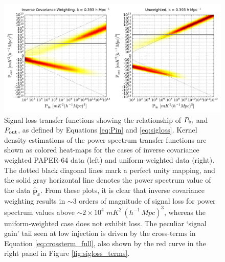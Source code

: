\documentclass[preprint2,numberedappendix,tighten]{aastex6}  %
\newcommand{\cc}[1]{{\color{purple} \textbf{[CC: #1]}}}
\begin{document}
\begin{figure}
	\centering
	\includegraphics[width=1\textwidth]{plots/sigloss_transfercurve_posneg.png}
	\caption{Signal loss transfer functions showing the relationship of $P_{\rm in}$ and $P_{\rm out}$, as defined by Equations \eqref{eq:Pin} and \eqref{eq:sigloss}. Kernel density estimations of the power spectrum transfer functions are shown as colored 
heat-maps for the cases of inverse covariance weighted PAPER-64 data (left) and uniform-weighted data (right). The dotted black 
diagonal lines mark a perfect unity mapping, and the solid gray horizontal line denotes the power spectrum value of the data $\widehat{\textbf{p}}_{x}$. From these plots, it is clear that inverse covariance weighting results in $\sim3$ orders of magnitude of signal loss 
for power spectrum values above $\sim$$2 \times 10^{4}$ $mK^{2} \, (h^{-1} \, Mpc)^{3}$, whereas the uniform-weighted case does 
not exhibit loss. The peculiar `signal gain' tail seen at low injection is driven by the cross-terms in Equation \eqref{eq:crossterm_full}, also shown by the red curve in the right panel in Figure \ref{fig:sigloss_terms}.}
	\label{fig:sigloss_transfercurve}
\end{figure}

%
\end{document}
